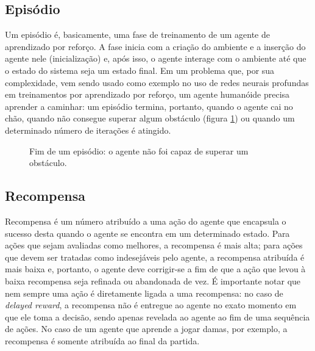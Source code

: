 \documentclass[cic,tc]{iiufrgs}
\begin{document}
    \subsection{Episódio}
      Um episódio é, basicamente, uma fase de treinamento de um agente de aprendizado por reforço. A fase inicia com a criação do ambiente e a inserção
      do agente nele (inicialização) e, após isso, o agente interage com o ambiente até que o estado do sistema seja um estado final. Em um problema que,
      por sua complexidade, vem sendo usado como exemplo no uso de redes neurais profundas em treinamentos por aprendizado por reforço, um agente humanóide
      precisa aprender a caminhar: um episódio termina, portanto, quando o agente cai no chão, quando não consegue superar algum obstáculo (figura \ref{fig:walkingrobot})
      ou quando um determinado número de iterações é atingido.
      \begin{figure}
          \caption{Fim de um episódio: o agente não foi capaz de superar um obstáculo.}
          \begin{center}
          \end{center}
          \label{fig:walkingrobot}
      \end{figure}
    
    \subsection{Recompensa}
    
    Recompensa é um número atribuído a uma ação do agente que encapsula o sucesso desta quando o agente se encontra em um determinado estado. Para ações que
     sejam avaliadas como melhores, a recompensa é mais alta;
    para ações que devem ser tratadas como indesejáveis pelo agente, a recompensa atribuída é mais baixa e, portanto, o agente deve corrigir-se a fim de que
    a ação que levou à baixa recompensa seja refinada ou abandonada de vez. É importante notar que nem sempre uma ação é diretamente ligada a uma recompensa:
    no caso de \textit{delayed reward}, a recompensa não é entregue ao agente no exato momento em que ele toma a decisão, sendo apenas revelada ao agente ao fim
    de uma sequência de ações. No caso de um
    agente que aprende a jogar damas, por exemplo, a recompensa é somente atribuída ao final da partida.
    
\end{document}

